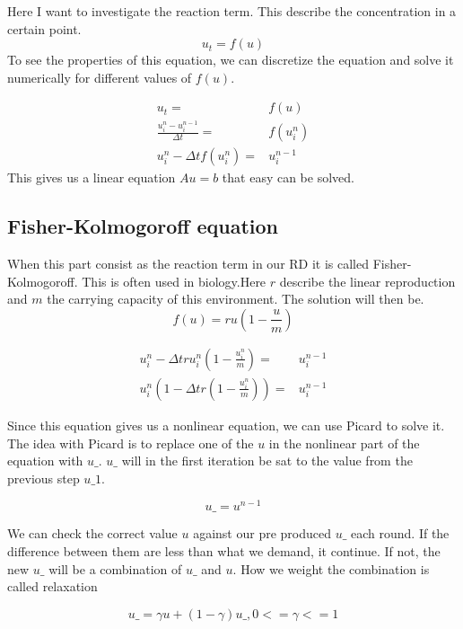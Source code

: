 \documentclass{article}
\begin{document}
Here I want to investigate the reaction term. This describe the concentration in
a certain point.
\begin{equation}
u_t = f(u)
\end{equation}
To see the properties of this equation, we can  discretize the equation and solve it numerically for
different values of $f(u)$.

\begin{align*}
u_t =& f(u)\\
\frac{u^n_i-u^{n-1}_i}{\Delta t}=& f(u^n_i)\\
u^n_i-\Delta t f(u^n_i) =& u^{n-1}_i
\end{align*}
This gives us a linear equation $Au = b$ that easy can be solved.

\subsection{Fisher-Kolmogoroff equation}

When this part consist as the reaction term in our RD it is called Fisher-Kolmogoroff. This
is often used in biology.Here $r$ describe the linear reproduction and
$m$ the carrying capacity of this environment. The solution
will then be.
\begin{equation}
f(u) = ru(1-\frac{u}{m})
\end{equation}


\begin{align*}
u^n_i-\Delta t ru^n_i(1-\frac{u^n_i}{m}) =& u^{n-1}_i\\
u^n_i(1-\Delta t r(1-\frac{u^n_i}{m})) =& u^{n-1}_i
\end{align*}

Since this equation gives us a nonlinear equation, we can use Picard to solve
it. The idea with Picard is to replace one of the $u$ in the nonlinear part of the equation with $u\_$. $u\_$ will in the first
iteration be sat to the value from the previous step $u\_1$. 

\begin{equation*}
	u\_ = u^{n-1}
\end{equation*}

We can check the correct value $u$ against our pre produced $u\_$ each round. If the difference between
them are less than what we demand, it continue. If not, the new $u\_$ will be a combination of $u\_$ and $u$. How we weight the combination is called relaxation 

\begin{equation*}
u\_ = \gamma u + (1-\gamma)u\_, 0<= \gamma <=1
\end{equation*}
\end{document}
